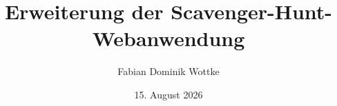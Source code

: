 ﻿\documentclass[oneside]{ausarbeitung}
\begin{document}


\Projektbericht

\Informatik

\title{Erweiterung der Scavenger-Hunt-Webanwendung}

\author{Fabian Dominik Wottke}

\examinerIsAProfessortrue   %


\date{15. August 2026}



\maketitle
\cleardoublepage

\setcounter{page}{1}


\makeaffirmation
\cleardoublepage

\end{document}
